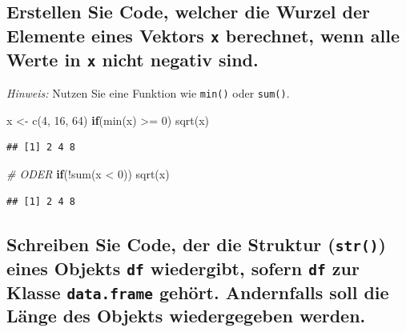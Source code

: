 \documentclass[12pt,a4paper]{article}
\newenvironment{Shaded}{\begin{snugshade}}{\end{snugshade}}
\newcommand{\CommentTok}[1]{\textcolor[rgb]{0.56,0.35,0.01}{\textit{#1}}}
\newcommand{\ControlFlowTok}[1]{\textcolor[rgb]{0.13,0.29,0.53}{\textbf{#1}}}
\newcommand{\DecValTok}[1]{\textcolor[rgb]{0.00,0.00,0.81}{#1}}
\newcommand{\FunctionTok}[1]{\textcolor[rgb]{0.00,0.00,0.00}{#1}}
\newcommand{\NormalTok}[1]{#1}
\newcommand{\OtherTok}[1]{\textcolor[rgb]{0.56,0.35,0.01}{#1}}
\newcommand{\SpecialCharTok}[1]{\textcolor[rgb]{0.00,0.00,0.00}{#1}}
\begin{document}
\hypertarget{erstellen-sie-code-welcher-die-wurzel-der-elemente-eines-vektors-berechnet-wenn-alle-werte-in-nicht-negativ-sind.}{%
\subsection{\texorpdfstring{Erstellen Sie Code, welcher die Wurzel der
Elemente eines Vektors \texttt{x} berechnet, wenn alle Werte in
\texttt{x} nicht negativ
sind.}{Erstellen Sie Code, welcher die Wurzel der Elemente eines Vektors  berechnet, wenn alle Werte in  nicht negativ sind.}}\label{erstellen-sie-code-welcher-die-wurzel-der-elemente-eines-vektors-berechnet-wenn-alle-werte-in-nicht-negativ-sind.}}

\emph{Hinweis:} Nutzen Sie eine Funktion wie \texttt{min()} oder
\texttt{sum()}.

\begin{Shaded}
\begin{Highlighting}[]
\NormalTok{    x }\OtherTok{\textless{}{-}} \FunctionTok{c}\NormalTok{(}\DecValTok{4}\NormalTok{, }\DecValTok{16}\NormalTok{, }\DecValTok{64}\NormalTok{)}
    \ControlFlowTok{if}\NormalTok{(}\FunctionTok{min}\NormalTok{(x) }\SpecialCharTok{\textgreater{}=} \DecValTok{0}\NormalTok{) }\FunctionTok{sqrt}\NormalTok{(x)}
\end{Highlighting}
\end{Shaded}

\begin{verbatim}
## [1] 2 4 8
\end{verbatim}

\begin{Shaded}
\begin{Highlighting}[]
    \CommentTok{\# ODER}
    \ControlFlowTok{if}\NormalTok{(}\SpecialCharTok{!}\FunctionTok{sum}\NormalTok{(x }\SpecialCharTok{\textless{}} \DecValTok{0}\NormalTok{)) }\FunctionTok{sqrt}\NormalTok{(x)}
\end{Highlighting}
\end{Shaded}

\begin{verbatim}
## [1] 2 4 8
\end{verbatim}

\hypertarget{schreiben-sie-code-der-die-struktur-eines-objekts-wiedergibt-sofern-zur-klasse-gehuxf6rt.-andernfalls-soll-die-luxe4nge-des-objekts-wiedergegeben-werden.}{%
\subsection{\texorpdfstring{Schreiben Sie Code, der die Struktur
(\texttt{str()}) eines Objekts \texttt{df} wiedergibt, sofern
\texttt{df} zur Klasse \texttt{data.frame} gehört. Andernfalls soll die
Länge des Objekts wiedergegeben
werden.}{Schreiben Sie Code, der die Struktur () eines Objekts  wiedergibt, sofern  zur Klasse  gehört. Andernfalls soll die Länge des Objekts wiedergegeben werden.}}\label{schreiben-sie-code-der-die-struktur-eines-objekts-wiedergibt-sofern-zur-klasse-gehuxf6rt.-andernfalls-soll-die-luxe4nge-des-objekts-wiedergegeben-werden.}}
\end{document}
